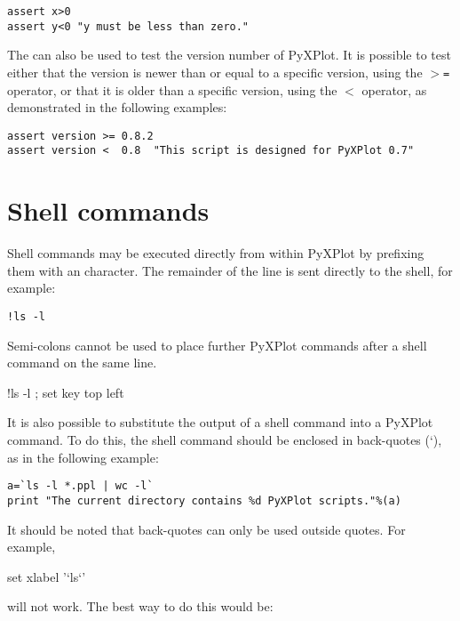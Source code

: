 \begin{verbatim}
assert x>0
assert y<0 "y must be less than zero."
\end{verbatim}

The  can also be used to test the version number of PyXPlot. It
is possible to test either that the version is newer than or equal to a
specific version, using the {\tt $>$=} operator, or that it is older than a
specific version, using the {\tt $<$} operator, as demonstrated in the
following examples:

\begin{verbatim}
assert version >= 0.8.2
assert version <  0.8  "This script is designed for PyXPlot 0.7"
\end{verbatim}


\section{Shell commands}

Shell commands may be executed directly from
within PyXPlot by prefixing them with an \indcmdts{!} character. The
remainder of the line is sent directly to the shell, for example:

\begin{verbatim}
!ls -l
\end{verbatim}

\noindent Semi-colons cannot be used to place further PyXPlot commands after a
shell command on the same line.

\begin{dontdo}
!ls -l ; set key top left
\end{dontdo}

It is also possible to substitute the output of a shell command into a PyXPlot
command. To do this, the shell command should be enclosed in back-quotes (`),
as in the following example:

\begin{verbatim}
a=`ls -l *.ppl | wc -l`
print "The current directory contains %d PyXPlot scripts."%(a)
\end{verbatim}

It should be noted that back-quotes can only be used outside quotes. For
example,

\begin{dontdo}
set xlabel '`ls`'
\end{dontdo}

\noindent will not work. The best way to do this would be:

